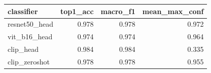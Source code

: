 \begin{tabular}{lrrr}
\toprule
classifier & top1_acc & macro_f1 & mean_max_conf \\
\midrule
resnet50_head & 0.978 & 0.978 & 0.972 \\
vit_b16_head & 0.974 & 0.974 & 0.964 \\
clip_head & 0.984 & 0.984 & 0.335 \\
clip_zeroshot & 0.978 & 0.978 & 0.955 \\
\bottomrule
\end{tabular}

